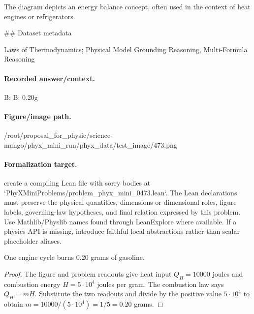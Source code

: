 The diagram depicts an energy balance concept, often used in the context of heat engines or refrigerators.

\#\# Dataset metadata

Laws of Thermodynamics; Physical Model Grounding Reasoning, Multi-Formula Reasoning

\paragraph{Recorded answer/context.}
B: B: 0.20g

\paragraph{Figure/image path.}
/root/proposal\_for\_physic/science-mango/phyx\_mini\_run/phyx\_data/test\_image/473.png

\paragraph{Formalization target.}
create a compiling Lean file with sorry bodies at `PhyXMiniProblems/problem\_phyx\_mini\_0473.lean`. The Lean declarations must preserve the physical quantities, dimensions or dimensional roles, figure labels, governing-law hypotheses, and final relation expressed by this problem.
Use Mathlib/Physlib names found through LeanExplore where available. If a physics API is missing, introduce faithful local abstractions rather than scalar placeholder aliases.

\begin{theorem}
\label{thm:physics:phyx_mini_0473:target}
One engine cycle burns $0.20$ grams of gasoline.
\end{theorem}
\begin{proof}
The figure and problem readouts give heat input $Q_H=10000$ joules and combustion energy $H=5\cdot10^4$ joules per gram.  The combustion law says $Q_H=mH$.  Substitute the two readouts and divide by the positive value $5\cdot10^4$ to obtain $m=10000/(5\cdot10^4)=1/5=0.20$ grams.
\end{proof}

